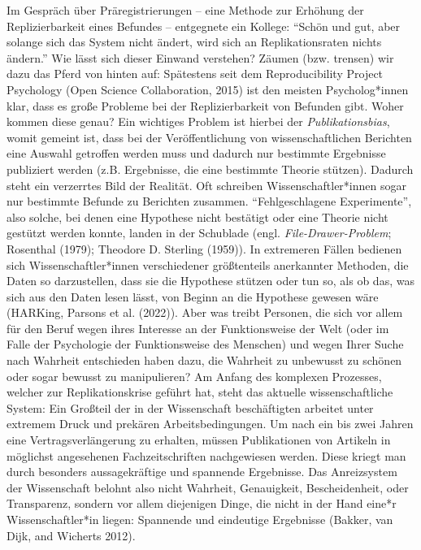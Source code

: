 \documentclass[
  letterpaper,
  DIV=11,
  numbers=noendperiod]{scrreprt}
\begin{document}
Im Gespräch über Präregistrierungen -- eine Methode zur Erhöhung der
Replizierbarkeit eines Befundes -- entgegnete ein Kollege: ``Schön und
gut, aber solange sich das System nicht ändert, wird sich an
Replikationsraten nichts ändern.'' Wie lässt sich dieser Einwand
verstehen? Zäumen (bzw. trensen) wir dazu das Pferd von hinten auf:
Spätestens seit dem Reproducibility Project Psychology (Open Science
Collaboration, 2015) ist den meisten Psycholog*innen klar, dass es große
Probleme bei der Replizierbarkeit von Befunden gibt. Woher kommen diese
genau? Ein wichtiges Problem ist hierbei der \emph{Publikationsbias},
womit gemeint ist, dass bei der Veröffentlichung von wissenschaftlichen
Berichten eine Auswahl getroffen werden muss und dadurch nur bestimmte
Ergebnisse publiziert werden (z.B. Ergebnisse, die eine bestimmte
Theorie stützen). Dadurch steht ein verzerrtes Bild der Realität. Oft
schreiben Wissenschaftler*innen sogar nur bestimmte Befunde zu Berichten
zusammen. ``Fehlgeschlagene Experimente'', also solche, bei denen eine
Hypothese nicht bestätigt oder eine Theorie nicht gestützt werden
konnte, landen in der Schublade (engl. \emph{File-Drawer-Problem};
Rosenthal (1979); Theodore D. Sterling (1959)). In extremeren Fällen
bedienen sich Wissenschaftler*innen verschiedener größtenteils
anerkannter Methoden, die Daten so darzustellen, dass sie die Hypothese
stützen oder tun so, als ob das, was sich aus den Daten lesen lässt, von
Beginn an die Hypothese gewesen wäre (HARKing, Parsons et al. (2022)).
Aber was treibt Personen, die sich vor allem für den Beruf wegen ihres
Interesse an der Funktionsweise der Welt (oder im Falle der Psychologie
der Funktionsweise des Menschen) und wegen Ihrer Suche nach Wahrheit
entschieden haben dazu, die Wahrheit zu unbewusst zu schönen oder sogar
bewusst zu manipulieren? Am Anfang des komplexen Prozesses, welcher zur
Replikationskrise geführt hat, steht das aktuelle wissenschaftliche
System: Ein Großteil der in der Wissenschaft beschäftigten arbeitet
unter extremem Druck und prekären Arbeitsbedingungen. Um nach ein bis
zwei Jahren eine Vertragsverlängerung zu erhalten, müssen Publikationen
von Artikeln in möglichst angesehenen Fachzeitschriften nachgewiesen
werden. Diese kriegt man durch besonders aussagekräftige und spannende
Ergebnisse. Das Anreizsystem der Wissenschaft belohnt also nicht
Wahrheit, Genauigkeit, Bescheidenheit, oder Transparenz, sondern vor
allem diejenigen Dinge, die nicht in der Hand eine*r Wissenschaftler*in
liegen: Spannende und eindeutige Ergebnisse (Bakker, van Dijk, and
Wicherts 2012).
\end{document}
